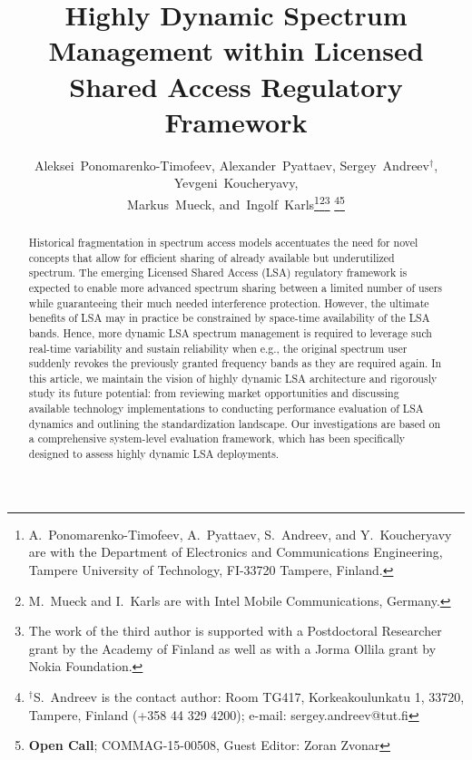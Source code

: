 \documentclass[journal]{IEEEtran}
\begin{document}
\title{Highly Dynamic Spectrum Management within Licensed Shared Access Regulatory Framework}


\author{Aleksei~Ponomarenko-Timofeev, Alexander~Pyattaev, Sergey~Andreev$^{\dagger}$, Yevgeni~Koucheryavy,\\ Markus~Mueck, and~Ingolf~Karls\thanks{A.~Ponomarenko-Timofeev, A.~Pyattaev, S.~Andreev, and Y.~Koucheryavy are with the Department of Electronics and Communications Engineering, 
Tampere University of Technology, FI-33720 Tampere, Finland.}\thanks{M.~Mueck and I.~Karls are with Intel Mobile Communications, Germany.}\thanks{The work of the third author is supported with a Postdoctoral Researcher grant by the Academy of Finland as well as with a Jorma Ollila grant by Nokia Foundation.}
\thanks{$^{\dagger}$S.~Andreev is the contact author: Room TG417, Korkeakoulunkatu 1, 33720, Tampere, Finland (+358 44 329 4200); e-mail: sergey.andreev@tut.fi}\thanks{\textbf{Open Call}; COMMAG-15-00508, Guest Editor: Zoran Zvonar}
}



\maketitle

\begin{abstract}
Historical fragmentation in spectrum access models accentuates the need for novel concepts that allow for efficient sharing of already available but underutilized spectrum. The emerging Licensed Shared Access (LSA) regulatory framework is expected to enable more advanced spectrum sharing between a limited number of users while guaranteeing their much needed interference protection. However, the ultimate benefits of LSA may in practice be constrained by space-time availability of the LSA bands. Hence, more dynamic LSA spectrum management is required to leverage such real-time variability and sustain reliability when e.g., the original spectrum user suddenly revokes the previously granted frequency bands as they are required again. In this article, we maintain the vision of highly dynamic LSA architecture and rigorously study its future potential: from reviewing market opportunities and discussing available technology implementations to conducting performance evaluation of LSA dynamics and outlining the standardization landscape. Our investigations are based on a comprehensive system-level evaluation framework, which has been specifically designed to assess highly dynamic LSA deployments.
\end{abstract}
\end{document}

